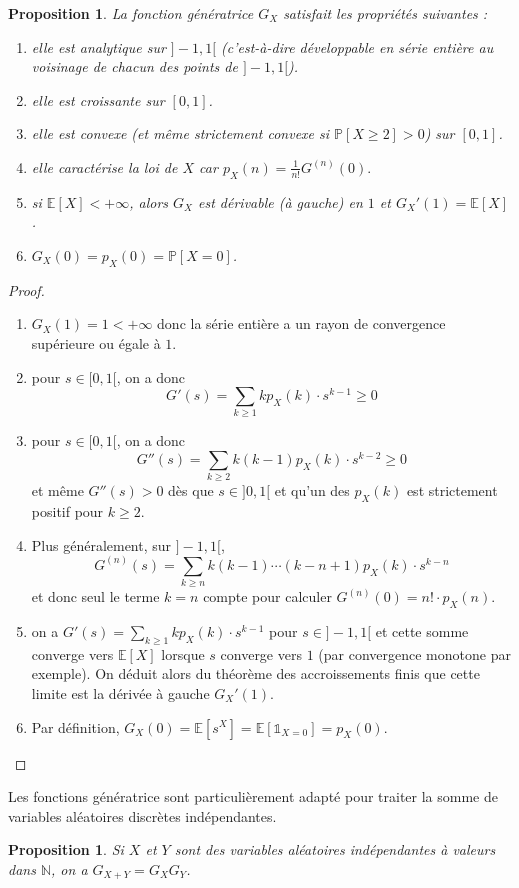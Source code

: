 \documentclass[a4paper,12pt]{book}
\newtheorem{propfr}[thmfr]{Proposition}
\begin{document}
\begin{propfr}La fonction génératrice $G_X$ satisfait les propriétés suivantes :
\begin{enumerate}\item elle est analytique sur $]-1,1[$ (c'est-à-dire développable en série entière au voisinage de chacun des points de $]-1,1[$).
\item elle est croissante sur $[0,1]$.
\item elle est convexe (et même strictement convexe si $\mathbb{P}[X\ge 2]>0$) sur $[0,1]$.
\item elle caractérise la loi de $X$ car $ p_X(n)=\frac{1}{n!}G^{(n)}(0).$
\item si $\mathbb{E}[X]<+\infty$, alors $G_X$ est dérivable (à gauche) en $1$ et $G_X'(1)=\mathbb{E}[X]$.
\item $G_X(0)=p_X(0)=\mathbb{P}[X=0]$.
\end{enumerate}
\end{propfr}
\begin{proof}
\begin{enumerate}\item$G_X(1)=1<+\infty$ donc la série entière a un rayon de convergence supérieure ou égale à $ 1$.
\item pour $s\in [0,1[$, on a donc
$$G'(s)=\sum_{k\geq 1}kp_X(k)\cdot s^{k-1}\geq 0  $$
\item pour $s\in [0,1[$, on a donc
$$G''(s)=\sum_{k\geq 2}k(k-1)p_X(k)\cdot s^{k-2}\geq 0  $$
et même $G''(s)>0$ dès que $s\in ]0,1[$ et qu'un des $p_X(k)$ est strictement positif pour $k\geq 2$.
\item Plus généralement, sur $]-1,1[$,
$$G^{(n)}(s)=\sum_{k\geq n}k(k-1)\cdots (k-n+1)p_X(k)\cdot s^{k-n}$$
et donc seul le terme $k=n$ compte pour calculer $G^{(n)}(0)=n!\cdot p_X(n)$.
\item on a $G'(s)=\sum_{k\geq 1}kp_X(k)\cdot s^{k-1}$ pour $s\in ]-1,1[$ et cette somme converge vers $\mathbb{E}[X]$ lorsque $s$ converge vers $1$ (par convergence monotone par exemple). On déduit alors du théorème des accroissements finis que cette limite est la dérivée à gauche $G_X'(1)$.
\item Par définition, $G_X(0)=\mathbb{E}[s^X]=\mathbb{E}[\mathds{1}_{X=0}]=p_X(0)$.
\end{enumerate}
\end{proof}
Les fonctions génératrice sont particulièrement adapté pour traiter la somme de variables aléatoires discrètes indépendantes.
\begin{propfr}Si $X$ et $Y$ sont des variables aléatoires indépendantes à valeurs dans $\mathbb{N}$, on a $G_{X+Y}=G_XG_Y$.
\end{propfr}
\end{document}
